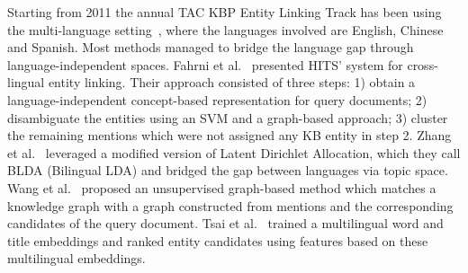 Starting from 2011 the annual TAC KBP Entity Linking Track has been using the multi-language setting~\cite{ji2010overview,ji2014overview,ji2015overview}, where the languages involved are English, Chinese and Spanish. 
Most methods managed to bridge the language gap through language-independent spaces.
Fahrni et al.~ presented HITS' system for cross-lingual entity linking. Their approach consisted of three steps: 1) obtain a language-independent concept-based representation for query documents; 2) disambiguate the entities using an SVM and a graph-based approach; 3) cluster the remaining mentions which were not assigned any KB entity in step 2.
Zhang et al.~ leveraged a modified version of Latent Dirichlet Allocation, which they call BLDA (Bilingual LDA) and bridged the gap between languages via topic space. 
Wang et al.~ proposed an unsupervised graph-based method which matches a knowledge graph with a graph constructed from mentions and the corresponding candidates of the query document.
Tsai et al.~ trained a multilingual word and title embeddings and ranked entity candidates using features based on these multilingual embeddings. 
